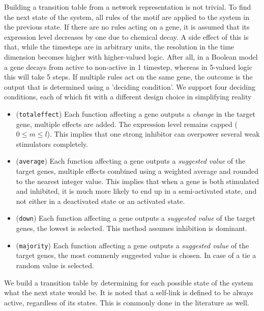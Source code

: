 \documentclass[../main.tex]{subfiles}
\begin{document}
Building a transition table from a network representation is not trivial.
To find the next state of the system, all rules of the motif are applied to the system in the previous state.
If there are no rules acting on a gene, it is assumed that its expression level decreases by one due to chemical decay.
A side effect of this is that, while the timesteps are in arbitrary units, the resolution in the time dimension becomes higher with higher-valued logic.
After all, in a Boolean model a gene decays from active to non-active in 1 timestep, whereas in 5-valued logic this will take 5 steps.
If multiple rules act on the same gene, the outcome is the output that is determined using a 'deciding condition'.
We support four deciding conditions, each of which fit with a different design choice in simplifying reality
%
\begin{itemize}
\item (\texttt{totaleffect}) Each function affecting a gene outputs a \textit{change} in the target gene, multiple effects are added. The expression level remains capped ($0 \le m \le l$). This implies that one strong inhibitor can overpower several weak stimulators completely.
\item (\texttt{average}) Each function affecting a gene outputs a \textit{suggested value} of the target genes, multiple effects combined using a weighted average and rounded to the nearest integer value. This implies that when a gene is both stimulated and inhibited, it is much more likely to end up in a semi-activated state, and not either in a deactivated state or an activated state.
\item (\texttt{down}) Each function affecting a gene outputs a \textit{suggested value} of the target genes, the lowest is selected. This method assumes inhibition is dominant.
\item (\texttt{majority}) Each function affecting a gene outputs a \textit{suggested value} of the target genes, the most commenly suggested value is chosen. In case of a tie a random value is selected.
\end{itemize}
%
We build a transition table by determining for each possible state of the system what the next state would be.
It is noted that a self-link is defined to be always active, regardless of its states.
This is commonly done in the literature as well.
\end{document}
